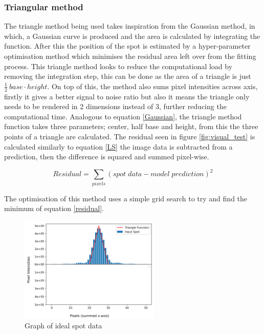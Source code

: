 \documentclass[aps,pra,a4paper,nofootinbib,onecolumn,tightenlines,longbibliography,12pt,amsfonts,amssymb,amsmath,floatfix]{revtex4-2} %
\begin{document}
    \subsubsection{Triangular method} %
    \label{ssub:Triangular method}
    
    The triangle method being used takes inspiration from the Gaussian method, in which,
    a Gaussian curve is produced and the area is calculated by integrating the function. 
    After this the position of the spot is estimated by a hyper-parameter optimisation method 
    which minimises the residual area left over from the fitting process.
    This triangle method looks to reduce the computational load by removing the integration step, 
    this can be done as the area of a triangle is just $\frac{1}{2}\ base\cdot height$. 
    On top of this, the method also sums pixel intensities across axis, firstly it gives a 
    better signal to noise ratio but also it means the triangle only needs to be rendered in 2 dimensions 
    instead of 3, further reducing the computational time. Analogous to equation \ref{Gaussian}, the triangle 
    method function takes three parameters; center, half base and height, from this the three points of a 
    triangle are calculated. The residual seen in figure \ref{fig:visual_test} is calculated 
    similarly to equation \ref{LS} the image data is subtracted from a prediction, then the difference 
    is squared and summed pixel-wise. 

    \begin{equation}\label{residual}
      Residual=\sum_{pixels}(spot\;data-model\;prediction)^2
    \end{equation}

    The optimisation of this method uses a simple grid search to try and 
    find the minimum of equation \ref{residual}.


    \begin{figure}[H]
      \begin{center}
        \includegraphics[width=0.6\textwidth]{project_pics/visual_test_2.png}
      \end{center}
      \caption{Graph of ideal spot data}
      \label{fig:visual_test_2}
    \end{figure}
\end{document}
